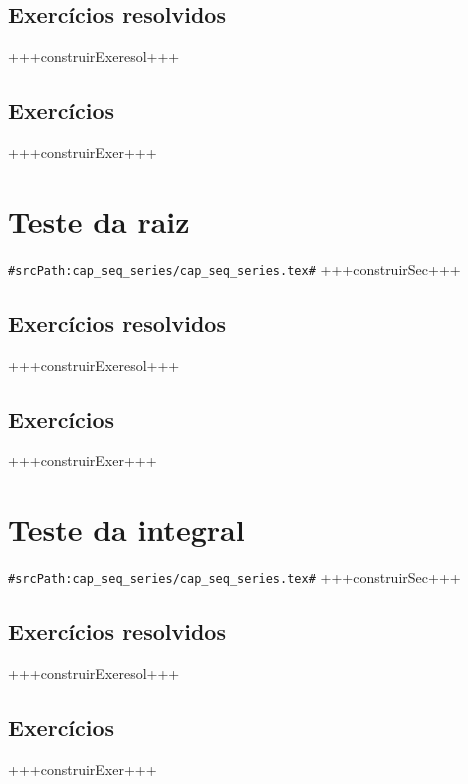 \subsection*{Exercícios resolvidos}

+++construirExeresol+++


\subsection*{Exercícios}

+++construirExer+++


\section{Teste da raiz}
\verb+#srcPath:cap_seq_series/cap_seq_series.tex#+
+++construirSec+++

\subsection*{Exercícios resolvidos}

+++construirExeresol+++


\subsection*{Exercícios}

+++construirExer+++


\section{Teste da integral}
\verb+#srcPath:cap_seq_series/cap_seq_series.tex#+
+++construirSec+++

\subsection*{Exercícios resolvidos}

+++construirExeresol+++


\subsection*{Exercícios}

+++construirExer+++


